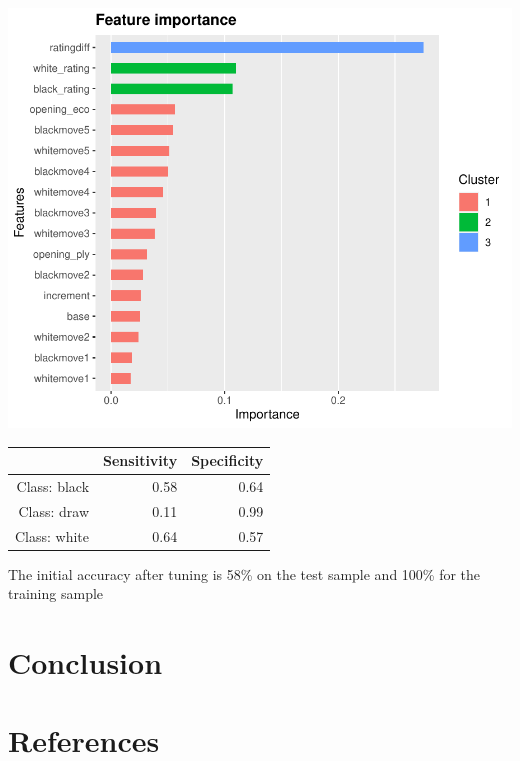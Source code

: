 \documentclass[12pt,preprint, authoryear]{elsarticle}
\let\origfigure\figure
\let\endorigfigure\endfigure
\renewenvironment{figure}[1][2] {
    \expandafter\origfigure\expandafter[H]
} {
    \endorigfigure
}
\let\origtable\table
\let\endorigtable\endtable
\renewenvironment{table}[1][2] {
    \expandafter\origtable\expandafter[H]
} {
    \endorigtable
}
\numberwithin{equation}{section}
\numberwithin{figure}{section}
\numberwithin{table}{section}
\begin{document}
\begin{figure}[H]

{\centering \includegraphics{WriteUp_files/figure-latex/importancehigh2-1} 

}

\caption{Feature Importance Tuned Model: Top Half\label{Figure14}}\label{fig:importancehigh2}
\end{figure}

\begin{table}[ht]
\centering
\begin{tabular}{rrr}
  \hline
 & Sensitivity & Specificity \\ 
  \hline
Class: black & 0.58 & 0.64 \\ 
  Class: draw & 0.11 & 0.99 \\ 
  Class: white & 0.64 & 0.57 \\ 
   \hline
\end{tabular}
\caption{Accuracy Top Sample: Tuned Model} 
\end{table}

The initial accuracy after tuning is 58\% on the test sample and 100\%
for the training sample

\hypertarget{conclusion}{%
\section{Conclusion}\label{conclusion}}

\newpage

\hypertarget{references}{%
\section{References}\label{references}}


\end{document}
